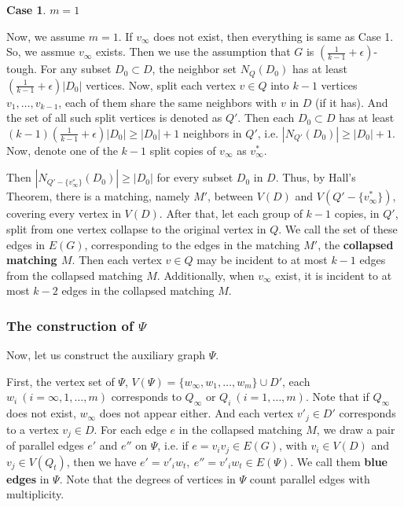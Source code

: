 \documentclass[12pt]{article}
\newtheorem{case}{Case}
\begin{document}
\begin{case}$m=1$\end{case}
Now, we assume $m=1$. If $v_{\infty}$ does not exist, then everything is same as Case 1.
So, we assmue $v_{\infty}$ exists. Then we use the assumption that $G$ is $(\frac{1}{k-1}+\epsilon)$-tough. For any subset $D_0\subset D$, the neighbor set $N_Q(D_0)$ has at least $(\frac{1}{k-1}+\epsilon)|D_0|$ vertices.
Now, split each vertex $v\in Q$ into $k-1$ vertices $v_1,\ldots,v_{k-1}$, each of them share the same neighbors with $v$ in $D$ (if it has). And the set of all such split vertices is denoted as $Q'$. Then each $D_0\subset D$ has at least $(k-1)(\frac{1}{k-1}+\epsilon)|D_0|\ge|D_0|+1$ neighbors in $Q'$, i.e. $|N_{Q'}(D_0)|\ge|D_0|+1$. Now, denote one of the $k-1$ split copies of $v_{\infty}$ as $v^*_{\infty}$.

Then $|N_{Q'-\{v^*_{\infty}\}}(D_0)|\ge|D_0|$ for every subset $D_0$ in $D$. Thus, by Hall's Theorem, there is a matching, namely $M'$, between $V(D)$ and $V(Q'-\{v^*_{\infty}\})$, covering every vertex in $V(D)$. 
After that, let each group of $k-1$ copies, in $Q'$, split from one vertex collapse to the original vertex in $Q$. We call the set of these edges in $E(G)$, corresponding to the edges in the matching $M'$, the {\bf collapsed matching $M$}. Then each vertex $v\in Q$ may be incident to at most $k-1$ edges from the collapsed matching $M$.
Additionally, when $v_{\infty}$ exist, it is incident to at most $k-2$ edges in the collapsed matching $M$.









\subsubsection{The construction of $\Psi$}
Now, let us construct the auxiliary graph $\Psi$.

First, the vertex set of $\Psi$, $V(\Psi)=\{w_{\infty},w_1,\ldots,w_m\}\cup D'$, each $w_i~(i=\infty,1,\ldots,m)$ corresponds to $Q_{\infty}$ or $Q_i~(i=1,\ldots,m)$. Note that if $Q_{\infty}$ does not exist, $w_{\infty}$ does not appear either. And each vertex $v'_j\in D'$ corresponds to a vertex $v_j\in D$. For each edge $e$ in the collapsed matching $M$, we draw a pair of parallel edges $e'$ and $e''$ on $\Psi$, i.e. if $e=v_iv_j\in E(G)$, with $v_i\in V(D)$ and $v_j\in V(Q_t)$, then we have $e'=v'_iw_t,~e''=v'_iw_t\in E(\Psi)$. We call them {\bf blue edges} in $\Psi$. Note that the degrees of vertices in $\Psi$ count parallel edges with multiplicity.
\end{document}
